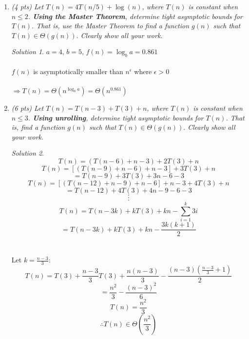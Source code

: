 \documentclass[12pt]{article}
\theoremstyle{remark}
\newtheorem*{solution}{Solution}
\newcommand{\makenonemptybox}[2]{%
\item[]
\fbox{%
\parbox[c][#1][t]{\dimexpr\linewidth-2\fboxsep-2\fboxrule}{
  \hrule width \hsize height 0pt
  #2
 }%
}%
\par\vspace{\ht\strutbox}
}
\begin{document}
\begin{enumerate}
\pagebreak


\pagebreak
\item {\itshape (4 pts) Let $T(n) = 4T(n/5) + \log(n)$, where $T(n)$ is constant when $n \leq 2$. \textbf{Using the Master Theorem}, determine tight asymptotic bounds for $T(n)$. That is, use the Master Theorem to find a function $g(n)$ such that $T(n) \in \Theta(g(n)).$ Clearly show all your work.}
\begin{solution}
$a=4$, $b=5$, $f(n) = \log_ba = 0.861$ \\ \\ $f(n)$ is asymptotically smaller than $n^\epsilon$ where $\epsilon > 0$ \\ \\ $\Rightarrow T(n) = \Theta(n^{\log_ba}) = \Theta(n^{0.861})$
\end{solution}


\pagebreak
\item {\itshape (6 pts) Let $T(n) = T(n-3) + T(3) + n$, where $T(n)$ is constant when $n \leq 3$. \textbf{Using unrolling}, determine tight asymptotic bounds for $T(n)$. That is, find a function $g(n)$ such that $T(n) \in \Theta(g(n)).$ Clearly show all your work.}
\begin{solution}
$$T(n) = (T(n-6) + n-3)+2T(3)+n$$ $$T(n) = [(T(n-9) +n-6)+n-3]+3T(3)+n$$ $$= T(n-9) + 3T(3) +3n - 6 - 3$$ $$T(n) = [(T(n-12) + n-9)+n-6]+n-3+4T(3)+n$$ $$= T(n-12) +4T(3) +4n -9-6-3$$ $$ \cdot$$ $$\cdot$$ $$\cdot$$ $$T(n) = T(n-3k) + kT(3) + kn - \sum_{i=1}^{k} 3i$$ $$=T(n-3k) + kT(3) + kn - \frac{3k(k+1)}{2}$$ \\ \\ Let $k=\frac{n-3}{3}$: $$T(n) = T(3)+\frac{n-3}{3}T(3)+\frac{n(n-3)}{3}-\frac{(n-3)(\frac{n-3}{3}+1)}{2}$$ $$=\frac{n^2}{3}-\frac{(n-3)^2}{6}$$ $$T(n) = \frac{n^2}{3}$$ $$\therefore T(n) \in \Theta(\frac{n^2}{3})$$
\end{solution}



\end{enumerate}
\end{document}
